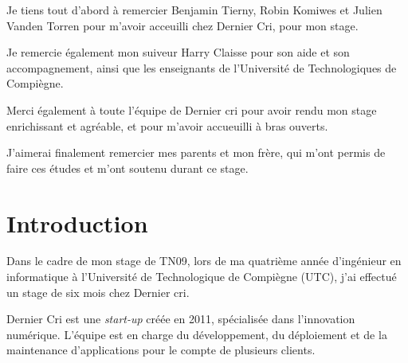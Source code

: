 \documentclass[12pt,a4paper]{article}
\begin{document}
  \bigskip

  Je tiens tout d'abord à remercier Benjamin Tierny, Robin Komiwes et
  Julien Vanden Torren pour m'avoir acceuilli chez Dernier Cri, pour mon
  stage.

  \bigskip

  Je remercie également mon suiveur Harry Claisse pour son aide et son
  accompagnement, ainsi que les enseignants de l'Université de
  Technologiques de Compiègne.

  \bigskip

  Merci également à toute l'équipe de Dernier cri pour avoir rendu mon
  stage enrichissant et agréable, et pour m'avoir accueuilli à bras
  ouverts.

  \bigskip

  J'aimerai finalement remercier mes parents et mon frère, qui m'ont
  permis de faire ces études et m'ont soutenu durant ce stage.

  \newpage

  \section{Introduction}\label{introduction}

  \bigskip

  Dans le cadre de mon stage de TN09, lors de ma quatrième année
  d'ingénieur en informatique à l'Université de Technologique de Compiègne
  (UTC), j'ai effectué un stage de six mois chez Dernier cri.

  \bigskip

  Dernier Cri est une \emph{start-up} créée en 2011, spécialisée dans
  l'innovation numérique. L'équipe est en charge du développement, du
  déploiement et de la maintenance d'applications pour le compte de
  plusieurs clients.
\end{document}
